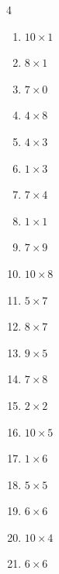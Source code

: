 \begin{multicols}{4}
\begin{enumerate}
  \item $10\times 1$
        \phantom{$=10$}

\columnbreak %

  \item $8\times 1$
        \phantom{$=8$}

  \item $7\times 0$
        \phantom{$=0$}

  \item $4\times 8$
        \phantom{$=32$}

  \item $4\times 3$
        \phantom{$=12$}

  \item $1\times 3$
        \phantom{$=3$}

  \item $7\times 4$
        \phantom{$=28$}

  \item $1\times 1$
        \phantom{$=1$}

  \item $7\times 9$
        \phantom{$=63$}

  \item $10\times 8$
        \phantom{$=80$}

  \item $5\times 7$
        \phantom{$=35$}

  \item $8\times 7$
        \phantom{$=56$}

  \item $9\times 5$
        \phantom{$=45$}

  \item $7\times 8$
        \phantom{$=56$}

  \item $2\times 2$
        \phantom{$=4$}

  \item $10\times 5$
        \phantom{$=50$}

  \item $1\times 6$
        \phantom{$=6$}

  \item $5\times 5$
        \phantom{$=25$}

  \item $6\times 6$
        \phantom{$=36$}

  \item $10\times 4$
        \phantom{$=40$}

  \item $6\times 6$
        \phantom{$=36$}


\end{enumerate}
\end{multicols}
